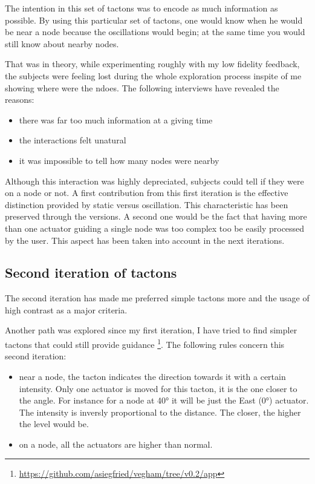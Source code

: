 The intention in this set of tactons was to encode as much information
as possible. By using this particular set of tactons, one would know
when he would be near a node because the oscillations would begin; at
the same time you would still know about nearby nodes.

That was in theory, while experimenting roughly with my low fidelity
feedback, the subjects were feeling lost during the whole exploration
process inspite of me showing where were the ndoes. The following
interviews have revealed the reasons:

\begin{itemize}
\item
  there was far too much information at a giving time
\item
  the interactions felt unatural
\item
  it was impossible to tell how many nodes were nearby
\end{itemize}

Although this interaction was highly depreciated, subjects could tell if they were on a node or not. A first
contribution from this first iteration is the effective distinction
provided by static versus oscillation. This characteristic has been
preserved through the versions. A second one would be the fact that
having more than one actuator guiding a single node was too complex too
be easily processed by the user. This aspect has been taken into account
in the next iterations.

\subsection{Second iteration of
tactons}\label{second-iteration-of-tactons}

The second iteration has made me preferred simple tactons more and the usage of
high contrast as a major criteria.

Another path was explored since my first iteration, I have tried to find
simpler tactons that could still provide guidance \footnote{\url{https://github.com/asiegfried/vegham/tree/v0.2/app}}.
The following rules concern this second iteration:

\begin{itemize}
\item
  near a node, the tacton indicates the direction towards it with a
  certain intensity. Only one actuator is moved for this tacton, it is
  the one closer to the angle. For instance for a node at 40° it will be
  just the East (0°) actuator. The intensity is inversly proportional to
  the distance. The closer, the higher the level would be.
\item
  on a node, all the actuators are higher than normal.
\end{itemize}

